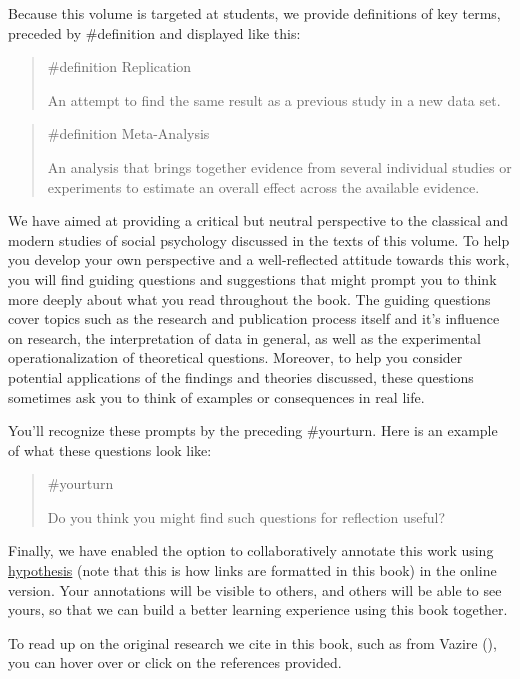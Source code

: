 \documentclass[
  letterpaper,
]{book}
\begin{document}
Because this volume is targeted at students, we provide definitions of
key terms, preceded by {\#definition} and displayed like this:

\begin{quote}
{\#definition} Replication

An attempt to find the same result as a previous study in a new data
set.
\end{quote}

\begin{quote}
{\#definition} Meta-Analysis

An analysis that brings together evidence from several individual
studies or experiments to estimate an overall effect across the
available evidence.
\end{quote}

We have aimed at providing a critical but neutral perspective to the
classical and modern studies of social psychology discussed in the texts
of this volume. To help you develop your own perspective and a
well-reflected attitude towards this work, you will find guiding
questions and suggestions that might prompt you to think more deeply
about what you read throughout the book. The guiding questions cover
topics such as the research and publication process itself and it's
influence on research, the interpretation of data in general, as well as
the experimental operationalization of theoretical questions. Moreover,
to help you consider potential applications of the findings and theories
discussed, these questions sometimes ask you to think of examples or
consequences in real life.

You'll recognize these prompts by the preceding {\#yourturn.} Here is an
example of what these questions look like:

\begin{quote}
{\#yourturn}

Do you think you might find such questions for reflection useful?
\end{quote}

Finally, we have enabled the option to collaboratively annotate this
work using \href{https://web.hypothes.is/}{hypothesis} (note that this
is how links are formatted in this book) in the online version. Your
annotations will be visible to others, and others will be able to see
yours, so that we can build a better learning experience using this book
together.

To read up on the original research we cite in this book, such as from
Vazire (), you can hover over or click on
the references provided.
\end{document}
